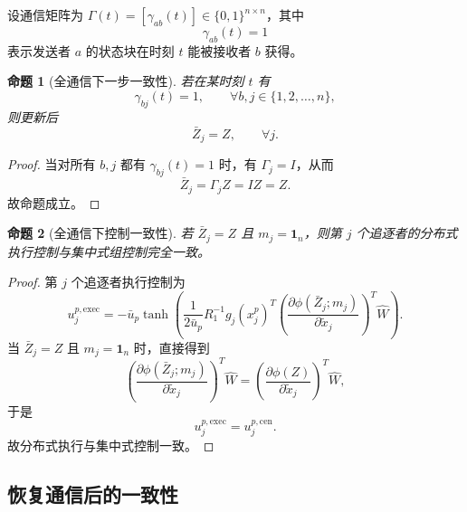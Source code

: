 \documentclass[12pt,a4paper]{ctexart}
\newtheorem{proposition}{命题}
\begin{document}
设通信矩阵为 $\Gamma(t)=[\gamma_{ab}(t)]\in\{0,1\}^{n\times n}$，其中
\begin{equation}
\gamma_{ab}(t)=1
\end{equation}
表示发送者 $a$ 的状态块在时刻 $t$ 能被接收者 $b$ 获得。

\begin{proposition}[全通信下一步一致性]
若在某时刻 $t$ 有
\begin{equation}
\gamma_{bj}(t)=1,\qquad \forall b,j\in\{1,2,\dots,n\},
\end{equation}
则更新后
\begin{equation}
\bar Z_j=Z,\qquad \forall j.
\end{equation}
\end{proposition}

\begin{proof}
当对所有 $b,j$ 都有 $\gamma_{bj}(t)=1$ 时，有 $\Gamma_j=I$，从而
\begin{equation}
\bar Z_j=\Gamma_j Z=IZ=Z.
\end{equation}
故命题成立。
\end{proof}

\begin{proposition}[全通信下控制一致性]
若 $\bar Z_j=Z$ 且 $m_j=\mathbf 1_n$，则第 $j$ 个追逐者的分布式执行控制与集中式组控制完全一致。
\end{proposition}

\begin{proof}
第 $j$ 个追逐者执行控制为
\begin{equation}
u_j^{p,\mathrm{exec}}
=
-\bar u_p
\tanh\!\left(
\frac{1}{2\bar u_p}
R_1^{-1}
g_j(x_j^p)^T
\left(\frac{\partial \phi(\bar Z_j;m_j)}{\partial \tilde x_j}\right)^T\hat W
\right).
\end{equation}
当 $\bar Z_j=Z$ 且 $m_j=\mathbf 1_n$ 时，直接得到
\begin{equation}
\left(\frac{\partial \phi(\bar Z_j;m_j)}{\partial \tilde x_j}\right)^T\hat W
=
\left(\frac{\partial \phi(Z)}{\partial \tilde x_j}\right)^T\hat W,
\end{equation}
于是
\begin{equation}
u_j^{p,\mathrm{exec}}=u_j^{p,\mathrm{cen}}.
\end{equation}
故分布式执行与集中式控制一致。
\end{proof}

\subsection{恢复通信后的一致性}
\end{document}
